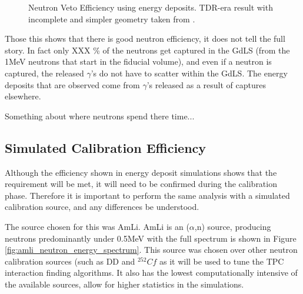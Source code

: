 \begin{figure}[!htbp]
\caption{Neutron Veto Efficiency using energy deposits. TDR-era result with incomplete and simpler geometry taken from \cite{sallyshaw_thesis_ref}.}
\label{fig:neutron_eff_energy_dep_tpc_neutrons}
\end{figure}

\par
Those this shows that there is good neutron efficiency, it does not tell the full story.
In fact only XXX \% of the neutrons get captured in the GdLS (from the 1MeV neutrons that start in the fiducial volume), and even if a neutron is captured, the released $\gamma$'s do not have to scatter within the GdLS.
The energy deposits that are observed come from $\gamma$'s released as a result of captures elsewhere.



\par
Something about where neutrons spend there time...

\subsection{Simulated Calibration Efficiency}
\par
Although the efficiency shown in energy deposit simulations shows that the requirement will be met, it will need to be confirmed during the calibration phase.
Therefore it is important to perform the same analysis with a simulated calibration source, and any differences be understood.

\par
The source chosen for this was AmLi.
AmLi is an ($\alpha$,n) source, producing neutrons predominantly under 0.5MeV with the full spectrum is shown in Figure \ref{fig:amli_neutron_energy_spectrum}.
This source was chosen over other neutron calibration sources (such as DD and ${}^{252}Cf$ as it will be used to tune the TPC interaction finding algorithms.
It also has the lowest computationally intensive of the available sources, allow for higher statistics in the simulations.

